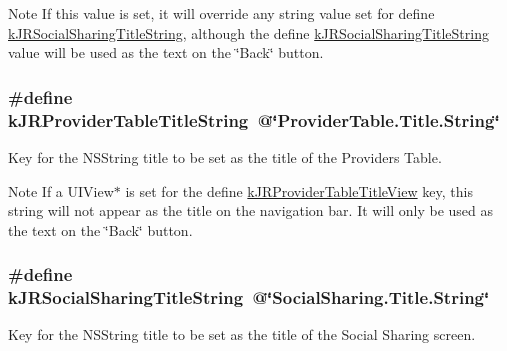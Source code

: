 \begin{DoxyNote}{Note}
If this value is set, it will override any string value set for define \hyperlink{group__custom_interface_ga8fb89469dc5225bf0ea4d1faca6aa2ab}{kJRSocialSharingTitleString}, although the define \hyperlink{group__custom_interface_ga8fb89469dc5225bf0ea4d1faca6aa2ab}{kJRSocialSharingTitleString} value will be used as the text on the \char`\"{}Back\char`\"{} button. 
\end{DoxyNote}
\hypertarget{group__custom_interface_gaf728e45125be9ca6fa515a39a77e7ce7}{
\subsubsection[{kJRProviderTableTitleString}]{\setlength{\rightskip}{0pt plus 5cm}\#define kJRProviderTableTitleString~@\char`\"{}ProviderTable.Title.String\char`\"{}}}
\label{group__custom_interface_gaf728e45125be9ca6fa515a39a77e7ce7}
Key for the {\ttfamily NSString} title to be set as the title of the Providers Table.

\begin{DoxyNote}{Note}
If a {\ttfamily UIView$\ast$} is set for the define \hyperlink{group__custom_interface_ga0bce97edf43c9cdf53cbcd1aa92c4798}{kJRProviderTableTitleView} key, this string will not appear as the title on the navigation bar. It will only be used as the text on the \char`\"{}Back\char`\"{} button. 
\end{DoxyNote}
\hypertarget{group__custom_interface_ga8fb89469dc5225bf0ea4d1faca6aa2ab}{
\subsubsection[{kJRSocialSharingTitleString}]{\setlength{\rightskip}{0pt plus 5cm}\#define kJRSocialSharingTitleString~@\char`\"{}SocialSharing.Title.String\char`\"{}}}
\label{group__custom_interface_ga8fb89469dc5225bf0ea4d1faca6aa2ab}
Key for the {\ttfamily NSString} title to be set as the title of the Social Sharing screen.

